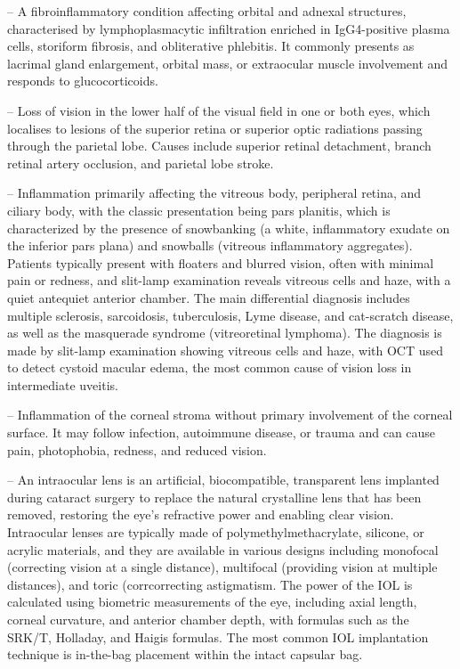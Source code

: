 -- A fibroinflammatory condition affecting orbital and adnexal structures, characterised by lymphoplasmacytic infiltration enriched in IgG4-positive plasma cells, storiform fibrosis, and obliterative phlebitis. It commonly presents as lacrimal gland enlargement, orbital mass, or extraocular muscle involvement and responds to glucocorticoids.

-- Loss of vision in the lower half of the visual field in one or both eyes, which localises to lesions of the superior retina or superior optic radiations passing through the parietal lobe. Causes include superior retinal detachment, branch retinal artery occlusion, and parietal lobe stroke.

-- Inflammation primarily affecting the vitreous body, peripheral retina, and ciliary body, with the classic presentation being pars planitis, which is characterized by the presence of snowbanking (a white, inflammatory exudate on the inferior pars plana) and snowballs (vitreous inflammatory aggregates). Patients typically present with floaters and blurred vision, often with minimal pain or redness, and slit-lamp examination reveals vitreous cells and haze, with a quiet antequiet anterior chamber. The main differential diagnosis includes multiple sclerosis, sarcoidosis, tuberculosis, Lyme disease, and cat-scratch disease, as well as the masquerade syndrome (vitreoretinal lymphoma). The diagnosis is made by slit-lamp examination showing vitreous cells and haze, with OCT used to detect cystoid macular edema, the most common cause of vision loss in intermediate uveitis.

-- Inflammation of the corneal stroma without primary involvement of the corneal surface. It may follow infection, autoimmune disease, or trauma and can cause pain, photophobia, redness, and reduced vision.

-- An intraocular lens is an artificial, biocompatible, transparent lens implanted during cataract surgery to replace the natural crystalline lens that has been removed, restoring the eye's refractive power and enabling clear vision. Intraocular lenses are typically made of polymethylmethacrylate, silicone, or acrylic materials, and they are available in various designs including monofocal (correcting vision at a single distance), multifocal (providing vision at multiple distances), and toric (corrcorrecting astigmatism. The power of the IOL is calculated using biometric measurements of the eye, including axial length, corneal curvature, and anterior chamber depth, with formulas such as the SRK/T, Holladay, and Haigis formulas. The most common IOL implantation technique is in-the-bag placement within the intact capsular bag.

